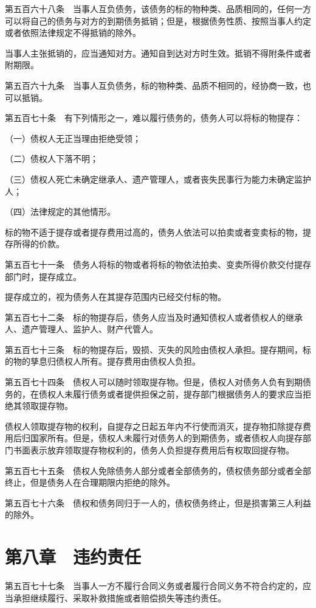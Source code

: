 \documentclass[UTF8,12pt,a4paper]{ctexbook}
\begin{document}
第五百六十八条　当事人互负债务，该债务的标的物种类、品质相同的，任何一方可以将自己的债务与对方的到期债务抵销；但是，根据债务性质、按照当事人约定或者依照法律规定不得抵销的除外。

当事人主张抵销的，应当通知对方。通知自到达对方时生效。抵销不得附条件或者附期限。

第五百六十九条　当事人互负债务，标的物种类、品质不相同的，经协商一致，也可以抵销。

第五百七十条　有下列情形之一，难以履行债务的，债务人可以将标的物提存：

（一）债权人无正当理由拒绝受领；

（二）债权人下落不明；

（三）债权人死亡未确定继承人、遗产管理人，或者丧失民事行为能力未确定监护人；

（四）法律规定的其他情形。

标的物不适于提存或者提存费用过高的，债务人依法可以拍卖或者变卖标的物，提存所得的价款。

第五百七十一条　债务人将标的物或者将标的物依法拍卖、变卖所得价款交付提存部门时，提存成立。

提存成立的，视为债务人在其提存范围内已经交付标的物。

第五百七十二条　标的物提存后，债务人应当及时通知债权人或者债权人的继承人、遗产管理人、监护人、财产代管人。

第五百七十三条　标的物提存后，毁损、灭失的风险由债权人承担。提存期间，标的物的孳息归债权人所有。提存费用由债权人负担。

第五百七十四条　债权人可以随时领取提存物。但是，债权人对债务人负有到期债务的，在债权人未履行债务或者提供担保之前，提存部门根据债务人的要求应当拒绝其领取提存物。

债权人领取提存物的权利，自提存之日起五年内不行使而消灭，提存物扣除提存费用后归国家所有。但是，债权人未履行对债务人的到期债务，或者债权人向提存部门书面表示放弃领取提存物权利的，债务人负担提存费用后有权取回提存物。

第五百七十五条　债权人免除债务人部分或者全部债务的，债权债务部分或者全部终止，但是债务人在合理期限内拒绝的除外。

第五百七十六条　债权和债务同归于一人的，债权债务终止，但是损害第三人利益的除外。

\section*{第八章　违约责任}

第五百七十七条　当事人一方不履行合同义务或者履行合同义务不符合约定的，应当承担继续履行、采取补救措施或者赔偿损失等违约责任。
\end{document}

